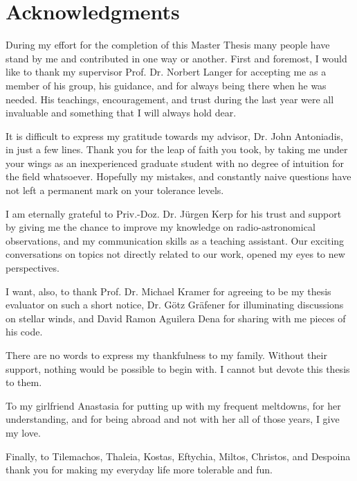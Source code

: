 \documentclass[../main/thesis_msc.tex]{subfiles}
\begin{document}
\chapter*{Acknowledgments}

During my effort for the completion of this Master Thesis many people have stand by me and contributed in one way or another. First and foremost, I would like to thank my supervisor Prof. Dr. Norbert Langer for accepting me as a member of his group, his guidance, and for always being there when he was needed. His teachings, encouragement, and trust during the last year were all invaluable and something that I will always hold dear.


It is difficult to express my gratitude towards my advisor, Dr. John Antoniadis, in just a few lines. Thank you for the leap of faith you took, by taking me under your wings as an inexperienced graduate student with no degree of intuition for the field whatsoever. Hopefully my mistakes, and constantly naive questions have not left a permanent mark on your tolerance levels.


I am eternally grateful to Priv.-Doz. Dr. J\"urgen Kerp for his trust and support by giving me the chance to improve my knowledge on radio-astronomical observations, and my communication skills as a teaching assistant. Our exciting conversations on topics not directly related to our work, opened my eyes to new perspectives. 

I want, also, to thank Prof. Dr. Michael Kramer for agreeing to be my thesis evaluator on such a short notice, Dr. G\"otz Gr\"afener for illuminating discussions on stellar winds, and David Ramon Aguilera Dena for sharing with me pieces of his code.


There are no words to express my thankfulness to my family. Without their support, nothing would be possible to begin with. I cannot but devote this thesis to them.


To my girlfriend Anastasia for putting up with my frequent meltdowns, for her understanding, and for being abroad and not with her all of those years, I give my love.


Finally, to Tilemachos, Thaleia, Kostas, Eftychia, Miltos, Christos, and Despoina thank you for making my everyday life more tolerable and fun.
\end{document}
